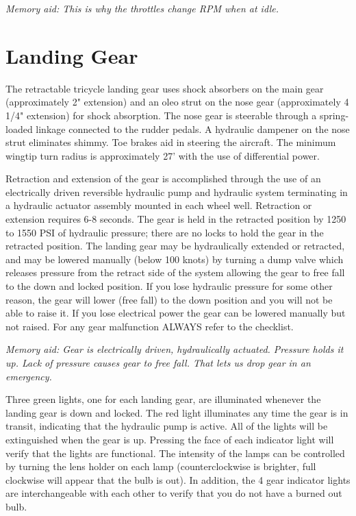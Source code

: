 \emph{Memory aid: This is why the throttles change RPM when at idle.}

\section{Landing Gear}

The retractable tricycle landing gear uses shock absorbers on the main gear (approximately 2" extension) and an
oleo strut on the nose gear (approximately 4 1/4" extension) for shock absorption. The nose gear is steerable
through a spring-loaded linkage connected to the rudder pedals. A hydraulic dampener on the nose strut eliminates
shimmy. Toe brakes aid in steering the aircraft. The minimum wingtip turn radius is approximately 27' with the use
of differential power.

Retraction and extension of the gear is accomplished through the use of an electrically driven reversible hydraulic
pump and hydraulic system terminating in a hydraulic actuator assembly mounted in each wheel well. Retraction or
extension requires 6-8 seconds. The gear is held in the retracted position by 1250 to 1550 PSI of hydraulic pressure;
there are no locks to hold the gear in the retracted position. The landing gear may be hydraulically extended or
retracted, and may be lowered manually (below 100 knots) by turning a dump valve which releases pressure from
the retract side of the system allowing the gear to free fall to the down and locked position. If you lose hydraulic
pressure for some other reason, the gear will lower (free fall) to the down position and you will not be able to raise
it. If you lose electrical power the gear can be lowered manually but not raised. For any gear malfunction
ALWAYS refer to the checklist.

\emph{Memory aid: Gear is electrically driven, hydraulically actuated. Pressure holds it up. Lack of pressure causes gear to free fall. That lets us drop gear in an emergency.}

Three green lights, one for each landing gear, are illuminated whenever the landing gear is down and locked. The
red light illuminates any time the gear is in transit, indicating that the hydraulic pump is active. All of the lights will
be extinguished when the gear is up. Pressing the face of each indicator light will verify that the lights are
functional. The intensity of the lamps can be controlled by turning the lens holder on each lamp (counterclockwise
is brighter, full clockwise will appear that the bulb is out). In addition, the 4 gear indicator lights are
interchangeable with each other to verify that you do not have a burned out bulb.

